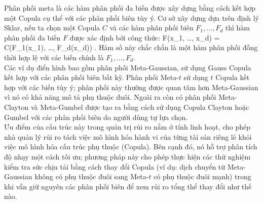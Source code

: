 Phân phối meta là các hàm phân phối đa biến được xây dựng bằng cách kết hợp một Copula cụ thể với các phân phối biên tùy ý. Cơ sở xây dựng dựa trên định lý Sklar, nếu ta chọn một Copula $C$ và các hàm phân phối biên $F_1, \dots, F_d$ thì hàm phân phối đa biến $F$ được xác định bởi công thức:
\bea
F(x_1, \dots, x_d) = C(F_1(x_1), \dots, F_d(x_d)) .
\eea
Hàm số này chắc chắn là một hàm phân phối đồng thời hợp lệ với các biến chính là $F_1, \dots, F_d$.\\
Các ví dụ điển hình bao gồm phân phối Meta-Gaussian, sử dụng Gauss Copula kết hợp với các phân phối biên bất kỳ. Phân phối Meta-$t$ sử dụng $t$ Copula kết hợp với các biến tùy ý; phân phối này thường được quan tâm hơn Meta-Gaussian vì nó có khả năng mô tả phụ thuộc đuôi. Ngoài ra còn có phân phối Meta-Clayton và Meta-Gumbel được tạo ra bằng cách sử dụng Copula Clayton hoặc Gumbel với các phân phối biên do người dùng tự lựa chọn.\\
Ưu điểm của cấu trúc này trong quản trị rủi ro nằm ở tính linh hoạt, cho phép nhà quản lý rủi ro tách việc mô hình hóa hành vi của từng tài sản riêng lẻ khỏi việc mô hình hóa cấu trúc phụ thuộc (Copula). Bên cạnh đó, nó hỗ trợ phân tích độ nhạy một cách tối ưu; phương pháp này cho phép thực hiện các thử nghiệm kiểm tra sức chịu tải bằng cách thay đổi Copula (ví dụ: dịch chuyển từ Meta-Gaussian không có phụ thuộc đuôi sang Meta-$t$ có phụ thuộc đuôi mạnh) trong khi vẫn giữ nguyên các phân phối biên để xem rủi ro tổng thể thay đổi như thế nào.
